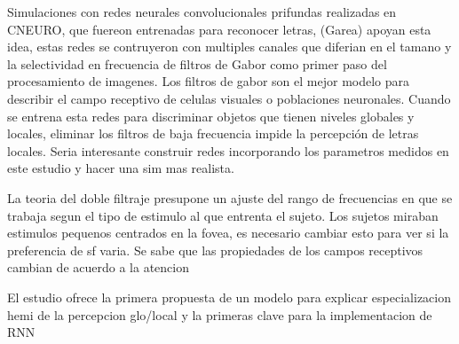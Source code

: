 Simulaciones con redes neurales convolucionales prifundas realizadas en CNEURO, que fuereon entrenadas para reconocer letras, (Garea) apoyan esta idea, estas redes se contruyeron con multiples canales que diferian en el tamano y la selectividad en frecuencia de filtros de Gabor como primer paso del procesamiento de imagenes. Los filtros de gabor son el mejor modelo para describir el campo receptivo de celulas visuales o poblaciones neuronales. Cuando se entrena esta redes para discriminar objetos que tienen niveles globales y locales, eliminar los filtros de baja frecuencia impide la percepci\'on de letras locales. Seria interesante construir redes incorporando los parametros medidos en este estudio y hacer una sim mas realista.

La teoria del doble filtraje presupone un ajuste del rango de frecuencias en que se trabaja segun el tipo de estimulo al que entrenta el sujeto. Los sujetos miraban estimulos pequenos centrados en la fovea, es necesario cambiar esto para ver si la preferencia de sf varia. Se sabe que las propiedades de los campos receptivos cambian de acuerdo a la atencion

El estudio ofrece la primera propuesta de un modelo para explicar especializacion hemi de la percepcion glo/local y la primeras clave para la implementacion de RNN


